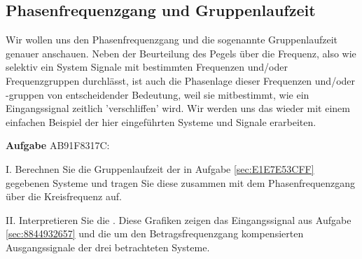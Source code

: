\newpage
\subsection{Phasenfrequenzgang und Gruppenlaufzeit}
\label{sec:AB91F8317C}
\begin{Ziel}
Wir wollen uns den Phasenfrequenzgang und die sogenannte Gruppenlaufzeit
genauer anschauen. Neben der Beurteilung des Pegels über die Frequenz,
also wie selektiv ein System Signale mit bestimmten Frequenzen und/oder
Frequenzgruppen durchlässt, ist auch die Phasenlage dieser Frequenzen und/oder
-gruppen von entscheidender Bedeutung, weil sie mitbestimmt, wie ein Eingangssignal
zeitlich 'verschliffen' wird.
Wir werden uns das wieder mit einem einfachen Beispiel der hier eingeführten
Systeme und Signale erarbeiten.
\end{Ziel}
\textbf{Aufgabe} {\tiny AB91F8317C}:

\noindent I. Berechnen Sie die Gruppenlaufzeit
der in Aufgabe \ref{sec:E1E7E53CFF} gegebenen Systeme und
tragen Sie diese zusammen mit dem Phasenfrequenzgang über die Kreisfrequenz auf.

\noindent II. Interpretieren Sie die . Diese Grafiken
zeigen das Eingangssignal aus Aufgabe \ref{sec:8844932657} und die um den
Betragsfrequenzgang kompensierten Ausgangssignale der drei betrachteten
Systeme.

